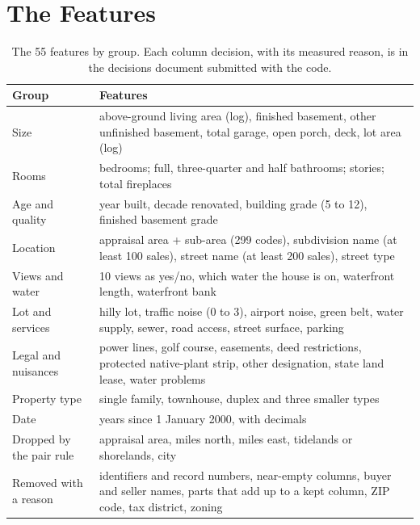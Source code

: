 \documentclass[sigconf,nonacm,10pt]{acmart}
\begin{document}



\appendix

\section{The Features}
\label{app:features}

\begin{table}[h]
\caption{The 55 features by group. Each column decision, with its measured reason, is in the decisions document submitted with the code.}
\label{tab:features}
\small
\begin{tabularx}{\columnwidth}{@{}L{1.9cm}Y@{}}
\toprule
Group & Features \\
\midrule
Size & above-ground living area (log), finished basement, other unfinished basement, total garage, open porch, deck, lot area (log) \\
Rooms & bedrooms; full, three-quarter and half bathrooms; stories; total fireplaces \\
Age and quality & year built, decade renovated, building grade (5 to 12), finished basement grade \\
Location & appraisal area + sub-area (299 codes), subdivision name (at least 100 sales), street name (at least 200 sales), street type \\
Views and water & 10 views as yes/no, which water the house is on, waterfront length, waterfront bank \\
Lot and services & hilly lot, traffic noise (0 to 3), airport noise, green belt, water supply, sewer, road access, street surface, parking \\
Legal and nuisances & power lines, golf course, easements, deed restrictions, protected native-plant strip, other designation, state land lease, water problems \\
Property type & single family, townhouse, duplex and three smaller types \\
Date & years since 1 January 2000, with decimals \\
\midrule
Dropped by the pair rule & appraisal area, miles north, miles east, tidelands or shorelands, city \\
Removed with a reason & identifiers and record numbers, near-empty columns, buyer and seller names, parts that add up to a kept column, ZIP code, tax district, zoning \\
\bottomrule
\end{tabularx}
\end{table}
\end{document}
